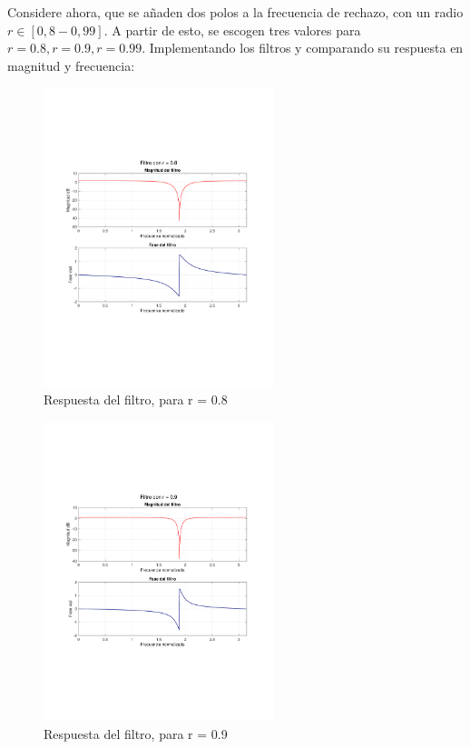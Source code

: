 		Considere ahora, que se añaden dos polos a la frecuencia de rechazo, con un radio $r \in [0,8  - 0,99]$. A partir de esto, se escogen tres valores para $r = 0.8, r = 0.9, r = 0.99$. Implementando los filtros y comparando su respuesta en magnitud y frecuencia:
		\begin{figure}[H]
			\center
			\includegraphics[width=0.6\textwidth,clip, trim = {1.9cm 6.8cm 2.3cm 7cm}]{../plots/ecg_poles_208.pdf}
			\caption{Respuesta del filtro, para r = 0.8}
			\label{fig:ecg_filter_r_08}
		\end{figure}

		\begin{figure}[H]
			\center
			\includegraphics[width=0.6\textwidth,clip, trim = {1.9cm 6.8cm 2.3cm 7cm}]{../plots/ecg_poles_209.pdf}
			\caption{Respuesta del filtro, para r = 0.9}
			\label{fig:ecg_filter_r_09}
		\end{figure}		
		
